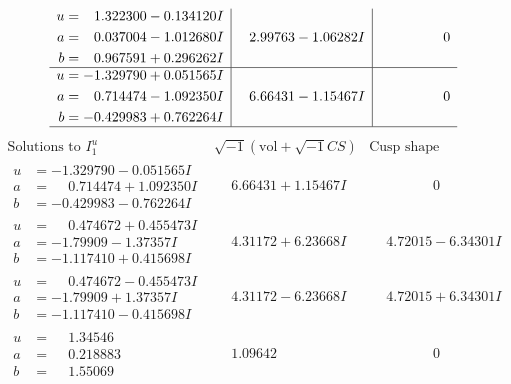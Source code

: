\documentclass[1p]{elsarticle_modified}
\theoremstyle{definition}
\newcommand{\I}{\sqrt{-1}}
\begin{document}
$$\begin{array}{c|c|c}
\begin{aligned}
u &= \phantom{-}1.322300 - 0.134120 I \\
a &= \phantom{-}0.037004 - 1.012680 I \\
b &= \phantom{-}0.967591 + 0.296262 I\end{aligned}
 & \phantom{-}2.99763 - 1.06282 I & \phantom{-0.000000 } 0 \\ \hline\begin{aligned}
u &= -1.329790 + 0.051565 I \\
a &= \phantom{-}0.714474 - 1.092350 I \\
b &= -0.429983 + 0.762264 I\end{aligned}
 & \phantom{-}6.66431 - 1.15467 I & \phantom{-0.000000 } 0\\
 \hline 
 \end{array}$$\newpage$$\begin{array}{c|c|c}  
\text{Solutions to }I^u_{1}& \I (\text{vol} + \sqrt{-1}CS) & \text{Cusp shape}\\
 \hline 
\begin{aligned}
u &= -1.329790 - 0.051565 I \\
a &= \phantom{-}0.714474 + 1.092350 I \\
b &= -0.429983 - 0.762264 I\end{aligned}
 & \phantom{-}6.66431 + 1.15467 I & \phantom{-0.000000 } 0 \\ \hline\begin{aligned}
u &= \phantom{-}0.474672 + 0.455473 I \\
a &= -1.79909 - 1.37357 I \\
b &= -1.117410 + 0.415698 I\end{aligned}
 & \phantom{-}4.31172 + 6.23668 I & \phantom{-}4.72015 - 6.34301 I \\ \hline\begin{aligned}
u &= \phantom{-}0.474672 - 0.455473 I \\
a &= -1.79909 + 1.37357 I \\
b &= -1.117410 - 0.415698 I\end{aligned}
 & \phantom{-}4.31172 - 6.23668 I & \phantom{-}4.72015 + 6.34301 I \\ \hline\begin{aligned}
u &= \phantom{-}1.34546\phantom{ +0.000000I} \\
a &= \phantom{-}0.218883\phantom{ +0.000000I} \\
b &= \phantom{-}1.55069\phantom{ +0.000000I}\end{aligned}
 & \phantom{-}1.09642\phantom{ +0.000000I} & \phantom{-0.000000 } 0 \\ \hline\begin{aligned}

\end{aligned}
\end{array}$$
\end{document}
